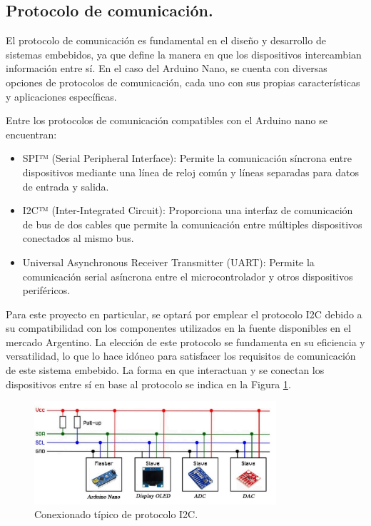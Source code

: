 \subsection{Protocolo de comunicación.}
El protocolo de comunicación es fundamental en el diseño y desarrollo de sistemas embebidos, ya que define la manera en que los dispositivos intercambian información entre sí. En el caso del Arduino Nano, se cuenta con diversas opciones de protocolos de comunicación, cada uno con sus propias características y aplicaciones específicas. \par 
Entre los protocolos de comunicación compatibles con el Arduino nano se encuentran:
\begin{itemize}
    \item SPI™ (Serial Peripheral Interface): Permite la comunicación síncrona entre dispositivos mediante una línea de reloj común y líneas separadas para datos de entrada y salida.
    \item I2C™ (Inter-Integrated Circuit): Proporciona una interfaz de comunicación de bus de dos cables que permite la comunicación entre múltiples dispositivos conectados al mismo bus.
    \item Universal Asynchronous Receiver Transmitter (UART): Permite la comunicación serial asíncrona entre el microcontrolador y otros dispositivos periféricos.
\end{itemize}\par 
Para este proyecto en particular, se optará por emplear el protocolo I2C debido a su compatibilidad con los componentes utilizados en la fuente disponibles en el mercado Argentino. La elección de este protocolo se fundamenta en su eficiencia y versatilidad, lo que lo hace idóneo para satisfacer los requisitos de comunicación de este sistema embebido.
La forma en que interactuan y se conectan los dispositivos entre sí en base al protocolo se indica en la Figura \ref{F:diagrama_protocolo_i2c}.

\begin{figure}[H]
    \centering
    \includegraphics[width=0.8\textwidth]{./imagenes/i2cprotocol.jpg}
    \caption{Conexionado típico de protocolo I2C.}
    \label{F:diagrama_protocolo_i2c}
\end{figure}


